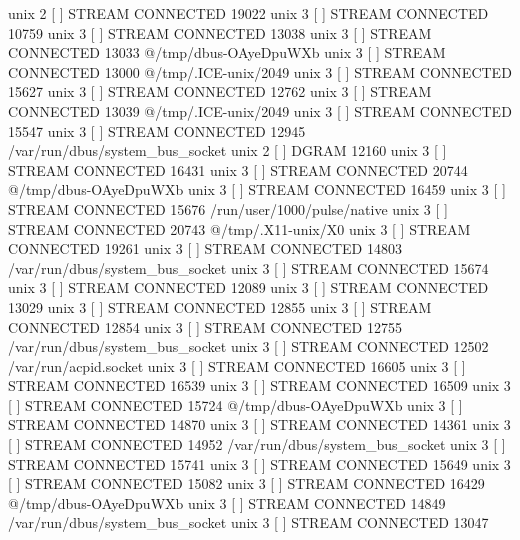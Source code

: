 unix  2      [ ]         STREAM     CONNECTED     19022    
unix  3      [ ]         STREAM     CONNECTED     10759    
unix  3      [ ]         STREAM     CONNECTED     13038    
unix  3      [ ]         STREAM     CONNECTED     13033    @/tmp/dbus-OAyeDpuWXb
unix  3      [ ]         STREAM     CONNECTED     13000    @/tmp/.ICE-unix/2049
unix  3      [ ]         STREAM     CONNECTED     15627    
unix  3      [ ]         STREAM     CONNECTED     12762    
unix  3      [ ]         STREAM     CONNECTED     13039    @/tmp/.ICE-unix/2049
unix  3      [ ]         STREAM     CONNECTED     15547    
unix  3      [ ]         STREAM     CONNECTED     12945    /var/run/dbus/system_bus_socket
unix  2      [ ]         DGRAM                    12160    
unix  3      [ ]         STREAM     CONNECTED     16431    
unix  3      [ ]         STREAM     CONNECTED     20744    @/tmp/dbus-OAyeDpuWXb
unix  3      [ ]         STREAM     CONNECTED     16459    
unix  3      [ ]         STREAM     CONNECTED     15676    /run/user/1000/pulse/native
unix  3      [ ]         STREAM     CONNECTED     20743    @/tmp/.X11-unix/X0
unix  3      [ ]         STREAM     CONNECTED     19261    
unix  3      [ ]         STREAM     CONNECTED     14803    /var/run/dbus/system_bus_socket
unix  3      [ ]         STREAM     CONNECTED     15674    
unix  3      [ ]         STREAM     CONNECTED     12089    
unix  3      [ ]         STREAM     CONNECTED     13029    
unix  3      [ ]         STREAM     CONNECTED     12855    
unix  3      [ ]         STREAM     CONNECTED     12854    
unix  3      [ ]         STREAM     CONNECTED     12755    /var/run/dbus/system_bus_socket
unix  3      [ ]         STREAM     CONNECTED     12502    /var/run/acpid.socket
unix  3      [ ]         STREAM     CONNECTED     16605    
unix  3      [ ]         STREAM     CONNECTED     16539    
unix  3      [ ]         STREAM     CONNECTED     16509    
unix  3      [ ]         STREAM     CONNECTED     15724    @/tmp/dbus-OAyeDpuWXb
unix  3      [ ]         STREAM     CONNECTED     14870    
unix  3      [ ]         STREAM     CONNECTED     14361    
unix  3      [ ]         STREAM     CONNECTED     14952    /var/run/dbus/system_bus_socket
unix  3      [ ]         STREAM     CONNECTED     15741    
unix  3      [ ]         STREAM     CONNECTED     15649    
unix  3      [ ]         STREAM     CONNECTED     15082    
unix  3      [ ]         STREAM     CONNECTED     16429    @/tmp/dbus-OAyeDpuWXb
unix  3      [ ]         STREAM     CONNECTED     14849    /var/run/dbus/system_bus_socket
unix  3      [ ]         STREAM     CONNECTED     13047    
